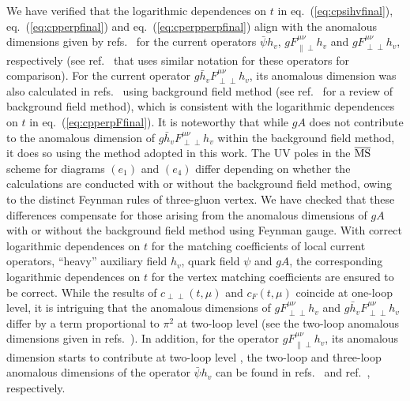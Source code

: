 We have  verified that the logarithmic dependences on $t$ in eq.~(\ref{eq:cpsihvfinal}), eq.~(\ref{eq:cpperpfinal}) and eq.~(\ref{eq:cperpperpfinal}) align with the anomalous dimensions given by refs.~\cite{Dorn:1980hs,Dorn:1981wa,Dorn:1986dt} for the current operators $\bar{\psi} h_v$, $gF^{\mu\nu}_{\|\perp}h_v$ and $gF^{\mu\nu}_{\perp\perp}h_v$, respectively (see ref.~\cite{Braun:2020ymy}  that uses similar notation for these operators for comparison). For the current operator $g\bar{h}_vF^{\mu\nu}_{\perp\perp}h_v$, its anomalous dimension  was also calculated in refs.~\cite{Eichten:1990vp,Falk:1990pz} using background field method (see ref.~\cite{Abbott:1981ke}  for a review of background field method), which is consistent with the logarithmic dependences on $t$  in eq.~(\ref{eq:cpperpFfinal}). It is noteworthy that while $gA$ does not contribute to the anomalous dimension of $g\bar{h}_vF^{\mu\nu}_{\perp\perp}h_v$ within the background field method, it does so using the method adopted in this work. The UV poles in the $\overline{\rm MS}$ scheme for diagrams $(e_1)$ and $(e_4)$ differ depending on whether the calculations are conducted with or without the background field method, owing to the distinct Feynman rules of three-gluon vertex. We have checked that these differences compensate for those arising from the anomalous dimensions of $gA$ with or without the background field method using Feynman gauge. With  correct logarithmic dependences on $t$ for the matching coefficients of  local current operators,  ``heavy” auxiliary field $h_v$,  quark field $\psi$ and $gA$, the corresponding logarithmic dependences on $t$ for the vertex matching coefficients are ensured to be correct. While the results of $c_{\perp\perp}(t, \mu)$ and $c_F(t, \mu)$ coincide at  one-loop level, it is intriguing that  the anomalous dimensions of $gF^{\mu\nu}_{\perp\perp}h_v$ and $g\bar{h}_vF^{\mu\nu}_{\perp\perp}h_v$ differ by a term proportional to $\pi^2$ at  two-loop level (see the two-loop anomalous dimensions given in refs.~\cite{Braun:2020ymy, Amoros:1997rx,Czarnecki:1997dz}). In addition, for the operator $gF^{\mu\nu}_{\|\perp}h_v$, its anomalous dimension starts to contribute at two-loop level \cite{Braun:2020ymy}, the two-loop and three-loop anomalous dimensions of the operator $\bar{\psi} h_v$ can be found in refs.~\cite{Broadhurst:1991fz,Ji:1991pr} and ref.~\cite{Chetyrkin:2003vi}, respectively.

